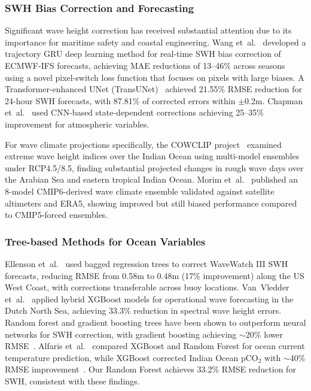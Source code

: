 \documentclass[conference]{IEEEtran}
\begin{document}
\subsubsection{SWH Bias Correction and Forecasting}

Significant wave height correction has received substantial attention due to its importance for maritime safety and coastal engineering. Wang et~al.~\cite{wang2024swh} developed a trajectory GRU deep learning method for real-time SWH bias correction of ECMWF-IFS forecasts, achieving MAE reductions of 13--46\% across seasons using a novel pixel-switch loss function that focuses on pixels with large biases. A Transformer-enhanced UNet (TransUNet)~\cite{transunet2024} achieved 21.55\% RMSE reduction for 24-hour SWH forecasts, with 87.81\% of corrected errors within $\pm$0.2m. Chapman et~al.~\cite{chapman2025} used CNN-based state-dependent corrections achieving 25--35\% improvement for atmospheric variables.

For wave climate projections specifically, the COWCLIP project~\cite{cowclip2023} examined extreme wave height indices over the Indian Ocean using multi-model ensembles under RCP4.5/8.5, finding substantial projected changes in rough wave days over the Arabian Sea and eastern tropical Indian Ocean. Morim et~al.~\cite{morim2024} published an 8-model CMIP6-derived wave climate ensemble validated against satellite altimeters and ERA5, showing improved but still biased performance compared to CMIP5-forced ensembles.

\subsubsection{Tree-based Methods for Ocean Variables}

Ellenson et~al.~\cite{ellenson2020} used bagged regression trees to correct WaveWatch III SWH forecasts, reducing RMSE from 0.58m to 0.48m (17\% improvement) along the US West Coast, with corrections transferable across buoy locations. Van~Vledder et~al.~\cite{vanvledder2023} applied hybrid XGBoost models for operational wave forecasting in the Dutch North Sea, achieving 33.3\% reduction in spectral wave height errors. Random forest and gradient boosting trees have been shown to outperform neural networks for SWH correction, with gradient boosting achieving $\sim$20\% lower RMSE~\cite{james2020}. Alfaris et~al.~\cite{alfaris2024} compared XGBoost and Random Forest for ocean current temperature prediction, while XGBoost corrected Indian Ocean pCO$_2$ with $\sim$40\% RMSE improvement~\cite{pco2_2025}. Our Random Forest achieves 33.2\% RMSE reduction for SWH, consistent with these findings.
\end{document}
